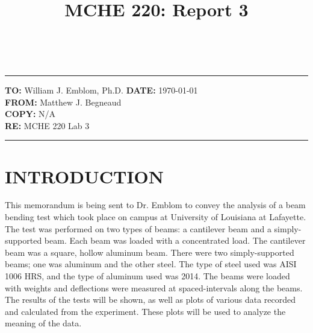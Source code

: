 \documentclass[12pt]{article}
\title{MCHE 220: Report 3}
\begin{document}
\raggedright     %
\fancyhf{}  
  \renewcommand{\headrulewidth}{0pt}
    \pagestyle{plain}
    
\captionsetup[table]{labelsep=space}

\begin{flushleft}
\hrulefill\\\hrule height 1pt
\vspace{5pt}
\textbf{TO: }William J. Emblom, Ph.D.  \hfill   \textbf{DATE: }\today                
\bigskip\\
\textbf{FROM: }Matthew J. Begneaud
\bigskip\\
\textbf{COPY: }N/A
\bigskip\\
\textbf{RE: }MCHE 220 Lab 3
\vspace{-10pt}
\end{flushleft}
\hrulefill \hrule height 1pt


\section*{\fontsize{12}{12}\selectfont INTRODUCTION}
This memorandum is being sent to Dr. Emblom to convey the analysis of a beam bending test which took place on campus at University of Louisiana at Lafayette. The test was performed on two types of beams: a cantilever beam and a simply-supported beam. Each beam was loaded with a concentrated load. The cantilever beam was a square, hollow aluminum beam. There were two simply-supported beams; one was aluminum and the other steel. The type of steel used was AISI 1006 HRS, and the type of aluminum used was 2014. The beams were loaded with weights and deflections were measured at spaced-intervals along the beams. The results of the tests will be shown, as well as plots of various data recorded and calculated from the experiment. These plots will be used to analyze the meaning of the data.
\bigskip
\end{document}
